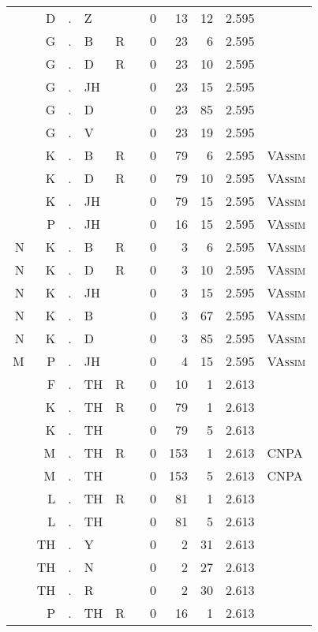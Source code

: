 \begin{longtable}{r@{ } r@{ } c@{ } l@{ } l@{ } l@{ } r r r r l }
  & D & . & Z &   &   & 0 & 13 & 12 & 2.595 &  \\
  & G & . & B & R &   & 0 & 23 & 6 & 2.595 &  \\
  & G & . & D & R &   & 0 & 23 & 10 & 2.595 &  \\
  & G & . & JH &   &   & 0 & 23 & 15 & 2.595 &  \\
  & G & . & D &   &   & 0 & 23 & 85 & 2.595 &  \\
  & G & . & V &   &   & 0 & 23 & 19 & 2.595 &  \\
  & K & . & B & R &   & 0 & 79 & 6 & 2.595 & \textsc{VAssim} \\
  & K & . & D & R &   & 0 & 79 & 10 & 2.595 & \textsc{VAssim} \\
  & K & . & JH &   &   & 0 & 79 & 15 & 2.595 & \textsc{VAssim} \\
  & P & . & JH &   &   & 0 & 16 & 15 & 2.595 & \textsc{VAssim} \\
N & K & . & B & R &   & 0 & 3 & 6 & 2.595 & \textsc{VAssim} \\
N & K & . & D & R &   & 0 & 3 & 10 & 2.595 & \textsc{VAssim} \\
N & K & . & JH &   &   & 0 & 3 & 15 & 2.595 & \textsc{VAssim} \\
N & K & . & B &   &   & 0 & 3 & 67 & 2.595 & \textsc{VAssim} \\
N & K & . & D &   &   & 0 & 3 & 85 & 2.595 & \textsc{VAssim} \\
M & P & . & JH &   &   & 0 & 4 & 15 & 2.595 & \textsc{VAssim} \\
  & F & . & TH & R &   & 0 & 10 & 1 & 2.613 &  \\
  & K & . & TH & R &   & 0 & 79 & 1 & 2.613 &  \\
  & K & . & TH &   &   & 0 & 79 & 5 & 2.613 &  \\
  & M & . & TH & R &   & 0 & 153 & 1 & 2.613 & \textsc{CNPA} \\
  & M & . & TH &   &   & 0 & 153 & 5 & 2.613 & \textsc{CNPA} \\
  & L & . & TH & R &   & 0 & 81 & 1 & 2.613 &  \\
  & L & . & TH &   &   & 0 & 81 & 5 & 2.613 &  \\
  & TH & . & Y &   &   & 0 & 2 & 31 & 2.613 &  \\
  & TH & . & N &   &   & 0 & 2 & 27 & 2.613 &  \\
  & TH & . & R &   &   & 0 & 2 & 30 & 2.613 &  \\
  & P & . & TH & R &   & 0 & 16 & 1 & 2.613 &  \\

\end{longtable}
